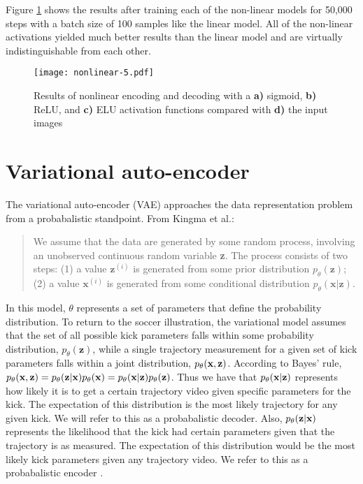 \documentclass{article}
\begin{document}
Figure \ref{fig:nonlinear_reconstruction} shows the results after training each of the non-linear models for 50,000 steps with a batch size of 100 samples like the linear model. All of the non-linear activations yielded much better results than the linear model and are virtually indistinguishable from each other.

\begin{figure}[h]
\begin{center}
\texttt{[image: nonlinear-5.pdf]} 
\caption{Results of nonlinear encoding and decoding with a \textbf{a)} sigmoid, \textbf{b)} ReLU, and \textbf{c)} ELU activation functions compared with \textbf{d)} the input images}
\label{fig:nonlinear_reconstruction}
\end{center}
\end{figure}

\section{Variational auto-encoder}
The variational auto-encoder (VAE) approaches the data representation problem from a probabalistic standpoint. From Kingma et al.:
\begin{quote}
We assume that the data are generated by some random process, involving an unobserved continuous random variable \textbf{z}. The process consists of two steps: (1) a value $\textbf{z}^{(i)}$ is generated from some prior distribution $p_\theta(\textbf{z})$; (2) a value $\textbf{x}^{(i)}$ is generated from some conditional distribution $p_\theta(\textbf{x}|\textbf{z})$.\cite{kingma}
\end{quote}
In this model, $\theta$ represents a set of parameters that define the probability distribution. To return to the soccer illustration, the variational model assumes that the set of all possible kick parameters falls within some probability distribution, $p_\theta(\textbf{z})$, while a single trajectory measurement for a given set of kick parameters falls within a joint distribution, $p_\theta(\textbf x,\textbf z)$. According to Bayes' rule, $p_\theta(\textbf x,\textbf z)=p_\theta(\textbf z|\textbf x) p_\theta(\textbf x)=p_\theta(\textbf x|\textbf z)p_\theta(\textbf z)$. Thus we have that $p_\theta(\textbf x | \textbf z)$ represents how likely it is to get a certain trajectory video given specific parameters for the kick. The expectation of this distribution is the most likely trajectory for any given kick. We will refer to this as a probabalistic decoder. Also, $p_\theta(\textbf z | \textbf x)$ represents the likelihood that the kick had certain parameters given that the trajectory is as measured. The expectation of this distribution would be the most likely kick parameters given any trajectory video. We refer to this as a probabalistic encoder \cite{kingma}.
\end{document}
